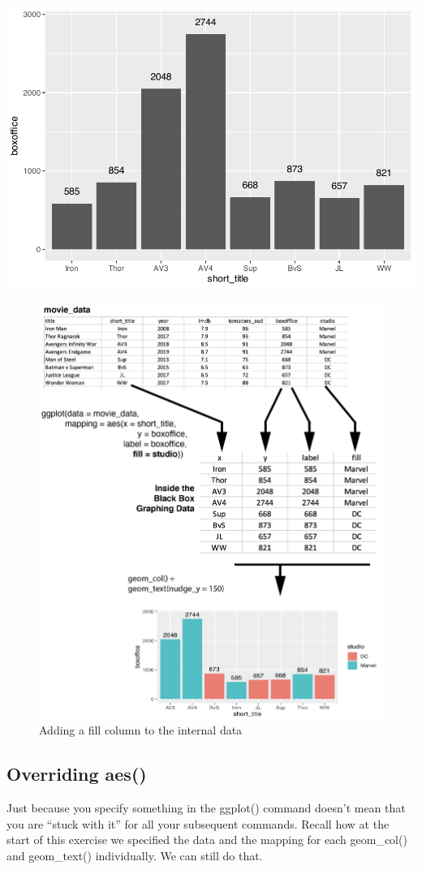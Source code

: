 \documentclass[
]{krantz}
\begin{document}
\includegraphics[width=0.65\linewidth]{bookdown_files/figure-latex/unnamed-chunk-112-1}

\begin{figure}
\includegraphics[width=0.7\linewidth]{ch_graphing/images/mapping_fill} \caption{Adding a fill column to the internal data}\label{fig:addfill}
\end{figure}

\hypertarget{overriding-aes}{%
\subsection{Overriding aes()}\label{overriding-aes}}

Just because you specify something in the ggplot() command doesn't mean that you are ``stuck with it'' for all your subsequent commands. Recall how at the start of this exercise we specified the data and the mapping for each geom\_col() and geom\_text() individually. We can still do that.
\end{document}
